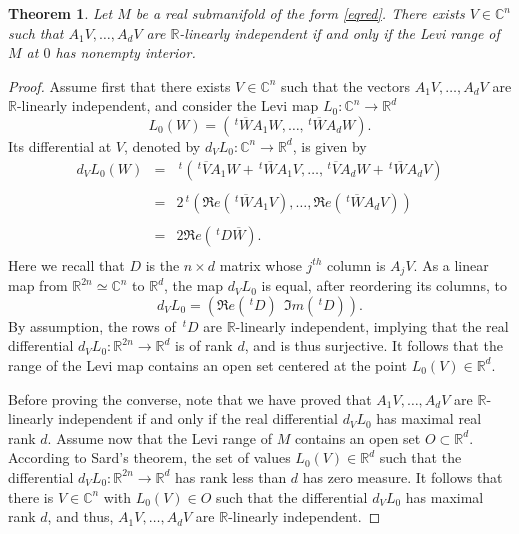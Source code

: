 \documentclass[12pt]{amsart}
\newcommand{\C}{\mathbb C}
\newcommand{\R}{\mathbb R}
\newcommand{\transp}{\,^t}
\newtheorem{theo}{Theorem}[section]
\theoremstyle{remark}
\theoremstyle{example}
\theoremstyle{definition}
\numberwithin{equation}{section}
\begin{document}
\begin{theo}\label{theorange}
Let  $M$ be a  real submanifold of the form \eqref{eqred}. There exists $V \in \C^n$ such that $A_1V,\ldots,A_dV$ are $\R$-linearly independent if and only if the Levi range of $M$ at $0$ has nonempty interior. 
\end{theo}
\begin{proof}
Assume first that there exists $V \in \C^n$ such that the vectors $A_1V,\ldots,A_dV$ are $\R$-linearly independent, and consider the Levi map $L_0: \C^n \to \R^d$
$$L_0(W)=\left(\transp \overline{W}A_1W,\ldots,\transp \overline{W}A_dW\right).$$
Its differential at $V$, denoted by $d_VL_0: \C^n \to \R^d$, is given by 
\begin{eqnarray*}
d_VL_0(W)&=&\transp\left(\transp \overline{V}A_1W+\transp \overline{W}A_1V,\ldots,\transp \overline{V}A_dW+\transp \overline{W}A_dV\right)\\
\\
& =& 2\transp\left(\Re e (\transp \overline{W}A_1V),\ldots,\Re e (\transp \overline{W}A_dV)\right)\\
\\
& =& 2 \Re e \left(\transp D \overline{W}\right).\\
\end{eqnarray*}
Here we recall that $D$ is the $n \times d$ matrix whose $j^{th}$ column is $A_jV$.  
As a linear map from $\R^{2n}\simeq \C^n$ to $\R^d$, the map $d_VL_0$ is equal, after reordering its columns, to 
$$d_VL_0=(\Re e (\transp D) \ \ \Im m  (\transp D)).$$
By assumption, the rows of $\transp D$ are $\R$-linearly independent, implying that the real differential $d_VL_0: \R^{2n} \to \R^d$ is of rank $d$, and is thus surjective.
It follows that the range of the Levi map contains an open set centered at the point $L_0(V) \in \R^d$. 

Before proving the converse, note that we have proved that $A_1V,\ldots,A_dV$ are $\R$-linearly independent if and only if the real differential $d_VL_0$ has maximal real rank $d$.  Assume now that the Levi range of $M$ contains an open set $O \subset \R^d$. According to Sard's theorem, the set of values $L_0(V)\in \R^d$ such that the differential $d_VL_0:\R^{2n}\to \R^d$ has rank less than $d$ has zero measure. It follows that there is $V \in \C^n$ with $L_0(V) \in O$ such that the differential  $d_VL_0$ has maximal rank $d$, and thus, $A_1V,\ldots,A_dV$ are $\R$-linearly independent. 
\end{proof}
\end{document}
